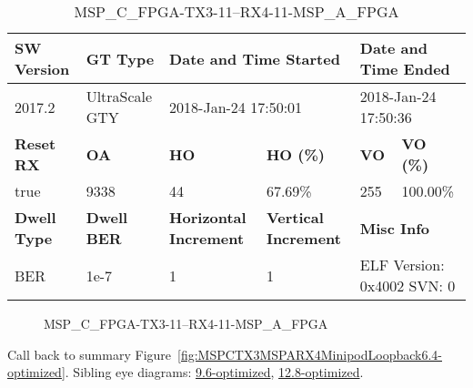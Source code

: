 \begin{table}[h]
\centering
\caption{MSP\_C\_FPGA-TX3-11--RX4-11-MSP\_A\_FPGA}
\label{tab:MSPCFPGATX311RX411MSPAFPGA6.4-optimized}
\begin{tabular}{@{}|l|l|l|l|l|l|@{}}
\toprule
\textbf{SW Version}                & \textbf{GT Type}   & \multicolumn{2}{l|}{\textbf{Date and Time Started}}            & \multicolumn{2}{l|}{\textbf{Date and Time Ended}}        \\ \midrule
2017.2                       & UltraScale GTY          & \multicolumn{2}{l|}{2018-Jan-24 17:50:01}                   & \multicolumn{2}{l|}{2018-Jan-24 17:50:36}               \\ \midrule
\textbf{Reset RX}                  & \textbf{OA} & \textbf{HO}   & \textbf{HO (\%)} & \textbf{VO} & \textbf{VO (\%)} \\ \midrule
true & 9338        & 44          & 67.69\%        & 255        & 100.00\%       \\ \midrule
\textbf{Dwell Type}                & \textbf{Dwell BER} & \textbf{Horizontal Increment} & \textbf{Vertical Increment}    & \multicolumn{2}{l|}{\textbf{Misc Info}}                  \\ \midrule
BER                            & 1e-7        & 1        & 1           & \multicolumn{2}{l|}{ELF Version: 0x4002 SVN: 0}                         \\ \bottomrule
\end{tabular}
\end{table}

\begin{figure}[h]
\caption{MSP\_C\_FPGA-TX3-11--RX4-11-MSP\_A\_FPGA} \label{fig:MSPCFPGATX311RX411MSPAFPGA6.4-optimized}
\end{figure}

Call back to summary Figure~\ref{fig:MSPCTX3MSPARX4MinipodLoopback6.4-optimized}.
Sibling eye diagrams: \hyperref[sec:MSPCFPGATX311RX411MSPAFPGA9.6-optimized]{9.6-optimized}, \hyperref[sec:MSPCFPGATX311RX411MSPAFPGA12.8-optimized]{12.8-optimized}.

\clearpage
\newpage

